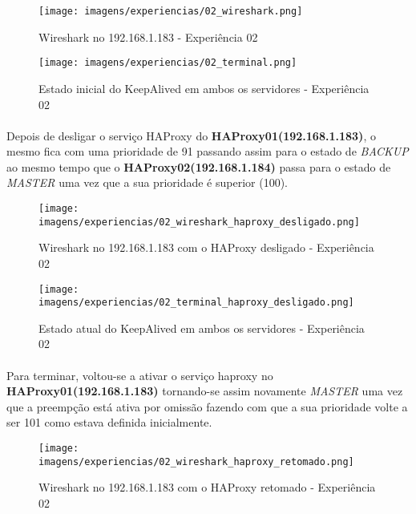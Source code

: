 \documentclass{report}
\begin{document}
\begin{figure}[H]
\center
\texttt{[image: imagens/experiencias/02\_wireshark.png]}
\caption{Wireshark no 192.168.1.183 - Experiência 02}
\label{fig.nav}
\end{figure}

\begin{figure}[H]
\center
\texttt{[image: imagens/experiencias/02\_terminal.png]}
\caption{Estado inicial do KeepAlived em ambos os servidores - Experiência 02}
\label{fig.nav}
\end{figure}


\paragraph{}
Depois de desligar o serviço HAProxy do \textbf{HAProxy01(192.168.1.183)}, o mesmo fica com uma prioridade de 91 passando assim para o estado de \emph{BACKUP} ao mesmo tempo que o \textbf{HAProxy02(192.168.1.184)} passa para o estado de \emph{MASTER} uma vez que a sua prioridade é superior (100).

\begin{figure}[H]
\center
\texttt{[image: imagens/experiencias/02\_wireshark\_haproxy\_desligado.png]}
\caption{Wireshark no 192.168.1.183 com o HAProxy desligado - Experiência 02}
\label{fig.nav}
\end{figure}

\begin{figure}[H]
\center
\texttt{[image: imagens/experiencias/02\_terminal\_haproxy\_desligado.png]}
\caption{Estado atual do KeepAlived em ambos os servidores - Experiência 02}
\label{fig.nav}
\end{figure}

\paragraph{}
Para terminar, voltou-se a ativar o serviço haproxy no \textbf{HAProxy01(192.168.1.183)} tornando-se assim novamente \emph{MASTER} uma vez que a preempção está ativa por omissão fazendo com que a sua prioridade volte a ser 101 como estava definida inicialmente.

\begin{figure}[H]
\center
\texttt{[image: imagens/experiencias/02\_wireshark\_haproxy\_retomado.png]}
\caption{Wireshark no 192.168.1.183 com o HAProxy retomado - Experiência 02}
\label{fig.nav}
\end{figure}
\end{document}
